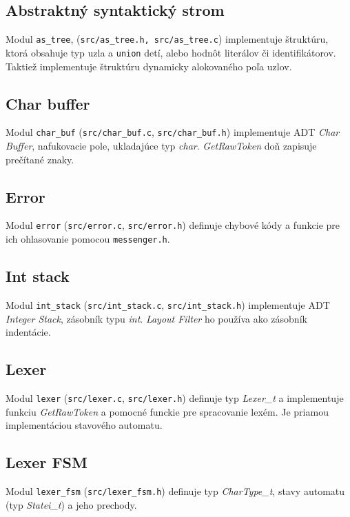 \documentclass[11pt,a4paper]{article}
\begin{document}
  \subsection{Abstraktný syntaktický strom}
  Modul \texttt{as\_tree}, (\texttt{src/as\_tree.h, src/as\_tree.c}) 
  implementuje štruktúru, ktorá obsahuje typ uzla a \texttt{union} detí,
  alebo hodnôt literálov či identifikátorov. Taktiež implementuje štruktúru
  dynamicky alokovaného poľa uzlov.

  \subsection{Char buffer}
  Modul \texttt{char\_buf} (\texttt{src/char\_buf.c}, \texttt{src/char\_buf.h})
  implementuje ADT \textit{Char Buffer}, nafukovacie pole, ukladajúce typ \textit{char}.
  \textit{GetRawToken} doň zapisuje prečítané znaky.

  \subsection{Error}
  Modul \texttt{error} (\texttt{src/error.c}, \texttt{src/error.h}) definuje chybové
  kódy a funkcie pre ich ohlasovanie pomocou \texttt{messenger.h}.

  \subsection{Int stack}
  Modul \texttt{int\_stack} (\texttt{src/int\_stack.c}, \texttt{src/int\_stack.h})
  implementuje ADT \textit{Integer Stack}, zásobník typu \textit{int}.
  \textit{Layout Filter} ho používa ako zásobník indentácie.

  \subsection{Lexer}
  Modul \texttt{lexer} (\texttt{src/lexer.c}, \texttt{src/lexer.h}) definuje
  typ \textit{Lexer\_t} a
  implementuje funkciu \textit{GetRawToken} a pomocné funckie pre spracovanie
  lexém. Je priamou implementáciou stavového automatu.

  \subsection{Lexer FSM}
  Modul \texttt{lexer\_fsm} (\texttt{src/lexer\_fsm.h}) definuje typ
  \textit{CharType\_t}, stavy automatu (typ \textit{Statei\_t}) a jeho
  prechody.
\end{document}
